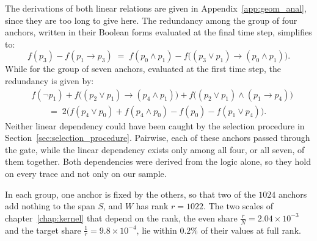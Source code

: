 \documentclass[titlepage,a4paper,11pt]{report}
\begin{document}
    The derivations of both linear relations are given in Appendix~\ref{app:geom_anal}, since they are too long to give here. The redundancy among the group of four anchors, written in their Boolean forms evaluated at the final time step, simplifies to:
    \begin{equation}\label{eq:dependency_last}
        f(p_3)-f(p_1\to p_3)\;=\;f(p_0\land p_1)-f\bigl((p_3\lor p_1)\to(p_0\land p_1)\bigr).
    \end{equation}
    While for the group of seven anchors, evaluated at the first time step, the redundancy is given by:
    \begin{equation}\label{eq:dependency_first}
    \begin{split}
        &f(\neg p_1)+f\bigl((p_2\lor p_1)\to(p_4\land p_1)\bigr)+f\bigl((p_2\lor p_1)\land(p_1\to p_4)\bigr)\\
        &\qquad=\;2\bigl(f(p_4\lor p_0)+f(p_4\land p_0)-f(p_0)-f(p_1\lor p_4)\bigr).
    \end{split}
    \end{equation}
    Neither linear dependency could have been caught by the selection procedure in Section~\ref{sec:selection_procedure}. Pairwise, each of these anchors passed through the gate, while the linear dependency exists only among all four, or all seven, of them together. Both dependencies were derived from the logic alone, so they hold on every trace and not only on our sample.

    In each group, one anchor is fixed by the others, so that two of the $1024$ anchors add nothing to the span $S$, and $W$ has rank $r=1022$. The two scales of chapter~\ref{chap:kernel} that depend on the rank, the even share $\frac rN=2.04\times10^{-3}$ and the target share $\frac1r=9.8\times10^{-4}$, lie within $0.2\%$ of their values at full rank.
\end{document}
